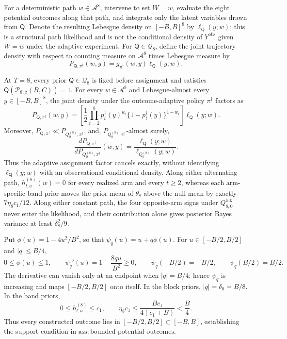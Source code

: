 For a deterministic path \(w\in\mathcal A^8\), intervene to set \(W=w\), evaluate the eight potential outcomes along that path, and integrate only the latent variables drawn from \(\mathsf Q\).  Denote the resulting Lebesgue density on \([-B,B]^8\) by \(\ell_{\mathsf Q}(y;w)\); this is a structural path likelihood and is not the conditional density of \(Y^{\mathrm{obs}}\) given \(W=w\) under the adaptive experiment.  For \(\mathsf Q\in\mathcal Q_8\), define the joint trajectory density with respect to counting measure on \(\mathcal A^8\) times Lebesgue measure by
\[
 P_{\mathsf Q,\pi^\dagger}(w,y)
 =g_{\pi^\dagger}(w,y)\ell_{\mathsf Q}(y;w).
\]

At \(T=8\), every prior \(\mathsf Q\in\mathcal Q_8\) is fixed before assignment and satisfies \(\mathsf Q(\mathcal P_{8,\beta}(B,C))=1\).  For every \(w\in\mathcal A^8\) and Lebesgue-almost every \(y\in[-B,B]^8\), the joint density under the outcome-adaptive policy \(\pi^\dagger\) factors as
\[
 P_{\mathsf Q,\pi^\dagger}(w,y)
 =\left[\frac12\prod_{t=2}^8p_t^\dagger(y)^{w_t}
 \{1-p_t^\dagger(y)\}^{1-w_t}\right]\ell_{\mathsf Q}(y;w).
\]
Moreover, \(P_{\mathsf Q,\pi^\dagger}\ll P_{Q_0^{(8)},\pi^\dagger}\), and, \(P_{Q_0^{(8)},\pi^\dagger}\)-almost surely,
\[
 \frac{dP_{\mathsf Q,\pi^\dagger}}
 {dP_{Q_0^{(8)},\pi^\dagger}}(w,y)
 =\frac{\ell_{\mathsf Q}(y;w)}{\ell_{Q_0^{(8)}}(y;w)}.
\]
Thus the adaptive assignment factor cancels exactly, without identifying \(\ell_{\mathsf Q}(y;w)\) with an observational conditional density.  Along either alternating path, \(h_{t,a}^{(8)}(w)=0\) for every realized arm and every \(t\ge2\), whereas each arm-specific band prior moves the prior mean of \(\theta_8\) above the null mean by exactly \(7\eta_8c_1/12\).  Along either constant path, the four opposite-arm signs under \(Q_{8,0}^{\mathrm{blk}}\) never enter the likelihood, and their contribution alone gives posterior Bayes variance at least \(\delta_8^2/9\).

Put \(\phi(u)=1-4u^2/B^2\), so that \(\psi_q(u)=u+q\phi(u)\).  For \(u\in[-B/2,B/2]\) and \(\lvert q\rvert\le B/4\),
\[
 0\le\phi(u)\le1,
 \qquad
 \psi_q'(u)=1-\frac{8qu}{B^2}\ge0,
 \qquad
 \psi_q(-B/2)=-B/2,
 \qquad
 \psi_q(B/2)=B/2.
\]
The derivative can vanish only at an endpoint when \(\lvert q\rvert=B/4\); hence \(\psi_q\) is increasing and maps \([-B/2,B/2]\) onto itself.  In the block priors, \(\lvert q\rvert=\delta_8=B/8\).  In the band priors,
\[
 0\le h_{t,a}^{(8)}\le c_1,
 \qquad
 \eta_8c_1\le \frac{Bc_1}{4(c_1+B)}<\frac B4.
\]
Thus every constructed outcome lies in \([-B/2,B/2]\subset[-B,B]\), establishing the support condition in \(\mathrm{ass{:}bounded\mbox{-}potential\mbox{-}outcomes}\).

